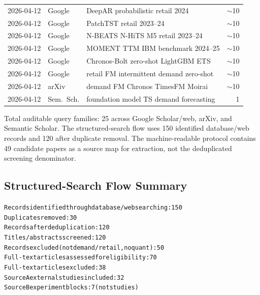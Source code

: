 \begin{table}[htbp]
\begin{tabular}{llp{6.5cm}r}
2026-04-12 & Google      & DeepAR probabilistic retail 2024            & $\sim$10 \\
2026-04-12 & Google      & PatchTST retail 2023--24                    & $\sim$10 \\
2026-04-12 & Google      & N-BEATS N-HiTS M5 retail 2023--24           & $\sim$10 \\
2026-04-12 & Google      & MOMENT TTM IBM benchmark 2024--25           & $\sim$10 \\
2026-04-12 & Google      & Chronos-Bolt zero-shot LightGBM ETS         & $\sim$10 \\
2026-04-12 & Google      & retail FM intermittent demand zero-shot      & $\sim$10 \\
2026-04-12 & arXiv       & demand FM Chronos TimesFM Moirai             & $\sim$10 \\
2026-04-12 & Sem.\ Sch.  & foundation model TS demand forecasting      & 1 \\
\bottomrule
\end{tabular}
\end{table}

Total auditable query families: 25 across Google Scholar/web, arXiv, and
Semantic Scholar.  The structured-search flow
uses 150 identified database/web records and 120 after duplicate removal.
The machine-readable protocol contains 49 candidate papers as a source map for
extraction, not the deduplicated screening denominator.

\subsection{Structured-Search Flow Summary}

\begin{alltt}
Records identified through database/web searching:    150
Duplicates removed:                                    30
Records after deduplication:                          120
Titles/abstracts screened:                            120
Records excluded (not demand/retail, no quant):        50
Full-text articles assessed for eligibility:            70
Full-text articles excluded:                            38
Source A external studies included:                     32
Source B experiment blocks:                              7 (not studies)
\end{alltt}
